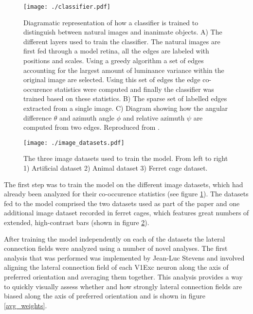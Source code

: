 \begin{figure}
	\centering
    \texttt{[image: ./classifier.pdf]}
	\caption[] {Diagramatic representation of how a classifier is
      trained to distinguish between natural images and inanimate
      objects. A) The different layers used to train the
      classifier. The natural images are first fed through a model
      retina, all the edges are labeled with positions and
      scales. Using a greedy algorithm a set of edges accounting for
      the largest amount of luminance variance within the original
      image are selected. Using this set of edges the edge
      co-occurence statistics were computed and finally the classifier
      was trained based on these statistics. B) The sparse set
      of labelled edges extracted from a single image. C) Diagram
      showing how the angular difference $\theta$ and azimuth angle
      $\phi$ and relative azimuth $\psi$ are computed from two
      edges. Reproduced from \cite{Perrinet2015}.}
	\label{classifier}
\end{figure}

\begin{figure}
	\centering
	\texttt{[image: ./image\_datasets.pdf]}
	\caption[]%
            {The three image datasets used to train the model. From
      left to right 1) Artificial dataset 2) Animal dataset 3) Ferret
      cage dataset.}
    \label{datasets}
\end{figure}

The first step was to train the model on the different image datasets,
which had already been analyzed for their co-occurence statistics (see
figure \ref{classifier}). The datasets fed to the model comprised the
two datasets used as part of the paper and one additional image
dataset recorded in ferret cages, which features great numbers of
extended, high-contrast bars (shown in figure \ref{datasets}).

After training the model independently on each of the datasets the
lateral connection fields were analyzed using a number of novel
analyses. The first analysis that was performed was implemented by
Jean-Luc Stevens and involved aligning the lateral connection field of
each V1Exc neuron along the axis of preferred orientation and
averaging them together. This analysis provides a way to quickly
visually assess whether and how strongly lateral connection fields are
biased along the axis of preferred orientation and is shown in figure
\ref{avg_weights}.

